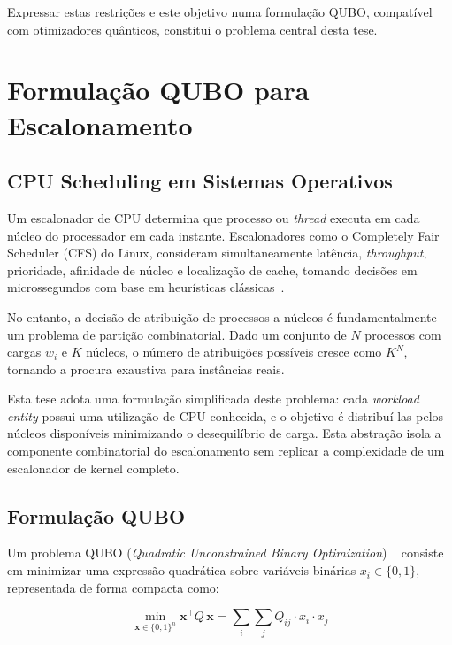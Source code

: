 \documentclass[12pt,a4paper]{article}
\begin{document}
Expressar estas restrições e este objetivo numa formulação QUBO, compatível com otimizadores quânticos,
constitui o problema central desta tese.

\section{Formulação QUBO para Escalonamento}

\subsection{CPU Scheduling em Sistemas Operativos}
Um escalonador de CPU determina que processo ou \textit{thread} executa em cada núcleo do processador
em cada instante. Escalonadores como o Completely Fair Scheduler (CFS) do Linux, consideram
simultaneamente latência, \textit{throughput}, prioridade, afinidade de núcleo e localização de cache,
tomando decisões em microssegundos com base em heurísticas clássicas~\cite{LinuxCFS}.

No entanto, a decisão de atribuição de processos a núcleos é fundamentalmente um problema de partição combinatorial. Dado um conjunto de $N$ processos com cargas $w_i$ e $K$ núcleos, o número de atribuições possíveis cresce como $K^N$, tornando a procura exaustiva para instâncias reais.

Esta tese adota uma formulação simplificada deste problema: cada \textit{workload entity} possui
uma utilização de CPU conhecida, e o objetivo é distribuí-las pelos núcleos disponíveis minimizando o
desequilíbrio de carga. Esta abstração isola a componente combinatorial do escalonamento sem replicar a complexidade de um escalonador de kernel completo.

\subsection{Formulação QUBO}

Um problema QUBO (\textit{Quadratic Unconstrained Binary Optimization}) ~\cite{Kochenberger2014QUBO,Glover2019QUBO} consiste em minimizar
uma expressão quadrática sobre variáveis binárias $x_i \in \{0, 1\}$, representada de forma compacta como:

\begin{equation}
    \min_{\mathbf{x} \in \{0,1\}^n} \mathbf{x}^\top Q\, \mathbf{x} = \sum_{i} \sum_{j} Q_{ij} \cdot x_i \cdot x_j
\end{equation}
\end{document}
